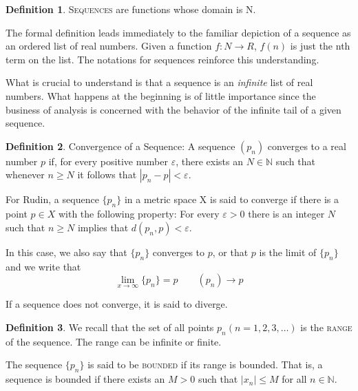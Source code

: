 \documentclass{tufte-book}
\theoremstyle{definition}
\newtheorem{definition}{Definition}[chapter]
\numberwithin{section}{chapter}
\begin{document}
\begin{definition}\textsc{Sequences} are functions whose domain is N.  \end{definition}

The formal definition leads immediately to the familiar depiction of a sequence as an ordered list of real numbers.  Given a function $f: N \to R$,   $f(n)$ is just the nth term on the list.  The notations for sequences reinforce this understanding.

What is crucial to understand is that a sequence is an \emph{infinite} list of real numbers.  What happens at the beginning is of little importance since the business of analysis is concerned with the behavior of the infinite tail of a given sequence.  

\begin{definition}Convergence of a Sequence:  A sequence $(p_n)$ converges to a real number $p$ if, for every positive number $\varepsilon$, there exists an $N \in \mathbb{N}$ such that whenever $n \geq N$ it follows that $|p_n - p|< \varepsilon$. \end{definition}


For Rudin, a sequence $\{p_n\}$ in a metric space X is said to converge if there is a point $p \in X$ with the following property:  For every $\varepsilon > 0$ there is an integer $N$ such that $n \geq N$ implies that $d(p_n, p) < \varepsilon$.

In this case, we also say that  $\{p_n\}$ converges to $p$, or that $p$ is the limit of  $\{p_n\}$ and we write that 
\[\lim_{x \to \infty} \{p_n\} = p   \qquad (p_n) \to p\]


If a sequence does not converge, it is said to diverge.  

\begin{definition}
We recall that the set of all points $p_n  (n=1,2,3, \ldots)$  is the \textsc{range} of the sequence.  The range can be infinite or finite.  


 The sequence $\{p_n\}$ is said to be \textsc{bounded} if its range is bounded.  That is, a sequence is bounded if there exists an $M > 0$ such that $|x_n|\leq M$ for all $n \in \mathbb{N}$.\end{definition}
\end{document}
